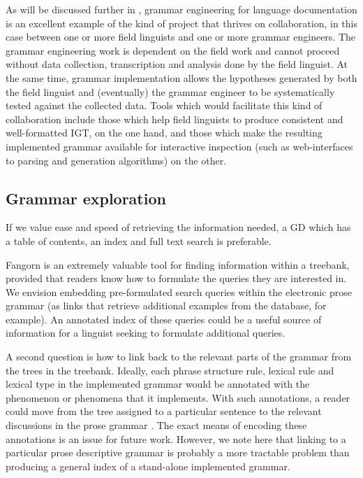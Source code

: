 As will be discussed further in , grammar engineering for
language documentation is an excellent example of the kind of project
that thrives on collaboration, in this case between one or more field
linguists and one or more grammar engineers.  The grammar engineering
work is dependent on the field work and cannot proceed without data
collection, transcription and analysis done by the field linguist.  At
the same time, grammar implementation allows the hypotheses generated
by both the field linguist and (eventually) the grammar engineer to be
systematically tested against the collected data.  Tools which would
facilitate this kind of collaboration include those which help field
linguists to produce consistent and well-formatted IGT, on the one
hand, and those which make the resulting implemented grammar available
for interactive inspection (such as web-interfaces to parsing and
generation algorithms) on the other.


\subsection{Grammar exploration}
\label{sub:grammar-exploration}

\begin{exe}
 If we value ease and speed of retrieving
the information needed, a GD which has a table of contents, an index
and full text search is preferable.
\end{exe}

Fangorn is an extremely valuable tool for finding information
within a treebank, provided that readers know how to formulate
the queries they are interested in.  We envision embedding pre-formulated
search queries within the electronic prose grammar (as links that
retrieve additional examples from the database, for example).  An
annotated index of these queries could be a useful source of information
for a linguist seeking to formulate additional queries.  

A second question is how to link back to the relevant parts of the
grammar from the trees in the treebank.  Ideally, each phrase
structure rule, lexical rule and lexical type in the implemented
grammar would be annotated with the phenomenon or phenomena that it
implements.  With such annotations, a reader could move from the tree
assigned to a particular sentence to the relevant discussions in the
prose grammar \citep{Thiebergertv}.  The exact means of encoding these annotations is an
issue for future work.  However, we note here that linking to a
particular prose descriptive grammar is probably a more tractable
problem than producing a general index of a stand-alone implemented
grammar.


